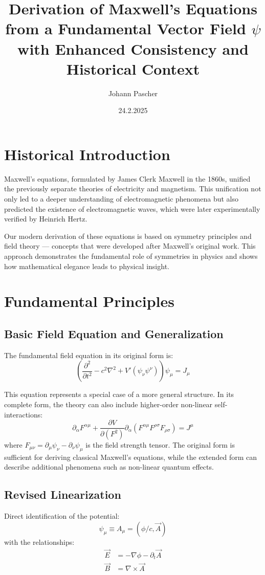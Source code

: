 \documentclass[12pt,a4paper]{article}
\title{Derivation of Maxwell's Equations from a Fundamental Vector Field $\psi$ with Enhanced Consistency and Historical Context}
\author{Johann Pascher}
\date{24.2.2025}
\begin{document}
	\maketitle
	
	\section{Historical Introduction}
	Maxwell's equations, formulated by James Clerk Maxwell in the 1860s, unified the previously separate theories of electricity and magnetism. This unification not only led to a deeper understanding of electromagnetic phenomena but also predicted the existence of electromagnetic waves, which were later experimentally verified by Heinrich Hertz.
	
	Our modern derivation of these equations is based on symmetry principles and field theory --- concepts that were developed after Maxwell's original work. This approach demonstrates the fundamental role of symmetries in physics and shows how mathematical elegance leads to physical insight.
	
	\section{Fundamental Principles}
	\subsection{Basic Field Equation and Generalization}
	The fundamental field equation in its original form is:
	\begin{equation}
		\left(\frac{\partial^2}{\partial t^2} - c^2\nabla^2 + V'(\psi_\nu \psi^\nu)\right)\psi_\mu = J_\mu
	\end{equation}
	
	This equation represents a special case of a more general structure. In its complete form, the theory can also include higher-order non-linear self-interactions:
	\begin{equation}
		\partial_\alpha F^{\alpha\mu} + \frac{\partial V}{\partial(F^2)} \partial_\alpha (F^{\alpha\mu} F^{\rho\sigma}F_{\rho\sigma}) = J^\mu
	\end{equation}
	where $F_{\mu\nu} = \partial_\mu \psi_\nu - \partial_\nu \psi_\mu$ is the field strength tensor. The original form is sufficient for deriving classical Maxwell's equations, while the extended form can describe additional phenomena such as non-linear quantum effects.
	
	\subsection{Revised Linearization}
	Direct identification of the potential:
	\begin{equation}
		\psi_\mu \equiv A_\mu = (\phi/c, \vec{A})
	\end{equation}
	with the relationships:
	\begin{align*}
		\vec{E} &= -\nabla\phi - \partial_t\vec{A} \\
		\vec{B} &= \nabla\times\vec{A}
	\end{align*}
	
\end{document}
